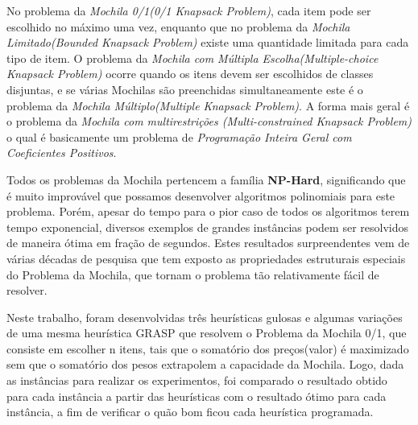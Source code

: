 \documentclass[a4paper, 12pt]{article}
\begin{document}
No problema da \textit{Mochila 0/1(0/1 Knapsack Problem)}, cada item pode ser escolhido no máximo uma vez, 
enquanto que no problema da \textit{Mochila Limitado(Bounded Knapsack Problem)} existe uma quantidade limitada 
para cada tipo de item. O problema da \textit{Mochila com Múltipla Escolha(Multiple-choice Knapsack Problem)}
ocorre quando os itens devem ser escolhidos de classes disjuntas, e se várias Mochilas são preenchidas 
simultaneamente este é o problema da \textit{Mochila Múltiplo(Multiple Knapsack Problem)}. 
A forma mais geral é o problema da \textit{Mochila com multirestrições (Multi-constrained Knapsack Problem)} 
o qual é basicamente um problema de \textit{Programação Inteira Geral com Coeficientes Positivos}.

Todos os problemas da Mochila pertencem a família \textbf{NP-Hard}\cite{pisinger1995algorithms}, significando que
é muito improvável que possamos desenvolver algoritmos polinomiais para este problema. Porém, apesar do tempo para o pior caso de todos os algoritmos terem tempo exponencial, diversos exemplos 
de grandes instâncias podem ser resolvidos de maneira ótima em fração de segundos. 
Estes resultados surpreendentes vem de várias décadas de pesquisa que tem exposto as propriedades 
estruturais especiais do Problema da Mochila, que tornam o problema tão relativamente fácil de resolver.

Neste trabalho, foram desenvolvidas três heurísticas gulosas e algumas variações de uma mesma heurística GRASP que resolvem 
o Problema da Mochila 0/1, que consiste em escolher n itens, tais que o somatório dos preços(valor) é maximizado sem 
que o somatório dos pesos extrapolem a capacidade da Mochila. Logo, dada as instâncias para realizar
os experimentos, foi comparado o resultado obtido para cada instância a partir das heurísticas com o resultado
ótimo para cada instância, a fim de verificar o quão bom ficou cada heurística programada.


\end{document}
